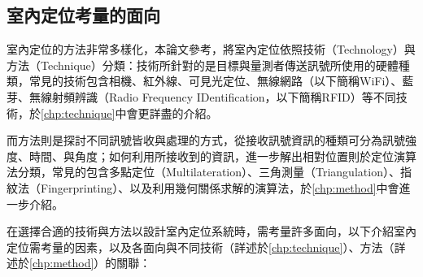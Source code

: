 







\subsection{室內定位考量的面向}
\label{chp:intro}




室內定位的方法非常多樣化，本論文參考\cite{survey_indoor2018}，將室內定位依照技術（Technology）與方法（Technique）分類：技術所針對的是目標與量測者傳送訊號所使用的硬體種類，常見的技術包含相機、紅外線、可見光定位、無線網路（以下簡稱WiFi）、藍芽、無線射頻辨識（Radio Frequency IDentification，以下簡稱RFID）等不同技術，於\ref{chp:technique}中會更詳盡的介紹。

而方法則是探討不同訊號皆收與處理的方式，從接收訊號資訊的種類可分為訊號強度、時間、與角度；如何利用所接收到的資訊，進一步解出相對位置則於定位演算法分類，常見的包含多點定位（Multilateration）、三角測量（Triangulation）、指紋法（Fingerprinting）、以及利用幾何關係求解的演算法，於\ref{chp:method}中會進一步介紹。


在選擇合適的技術與方法以設計室內定位系統時，需考量許多面向，以下介紹室內定位需考量的因素，以及各面向與不同技術（詳述於\ref{chp:technique}）、方法（詳述於\ref{chp:method}）的關聯：

